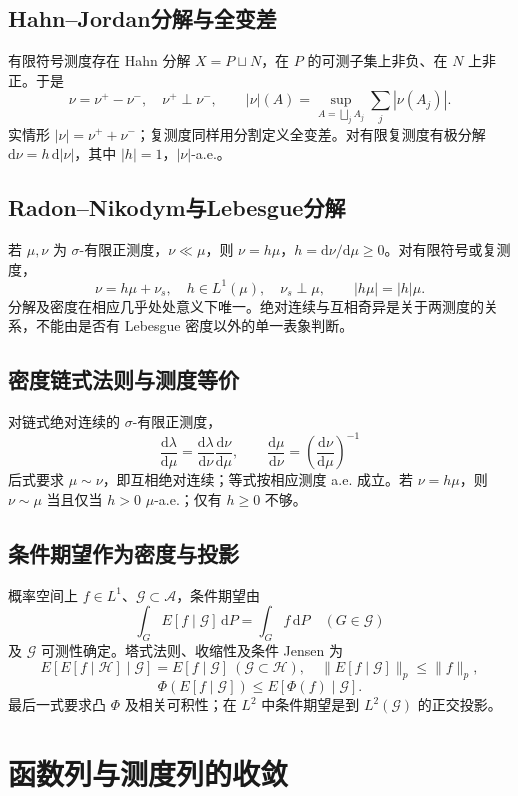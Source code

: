 \documentclass[../main.tex]{subfiles}
\begin{document}
\subsection{Hahn--Jordan分解与全变差}
有限符号测度存在 Hahn 分解 $X=P\sqcup N$，在 $P$ 的可测子集上非负、在 $N$ 上非正。于是
\[
\nu=\nu^+-\nu^-,\quad\nu^+\perp\nu^-,\qquad
|\nu|(A)=\sup_{A=\bigsqcup_jA_j}\sum_j|\nu(A_j)|.
\]
实情形 $|\nu|=\nu^++\nu^-$；复测度同样用分割定义全变差。对有限复测度有极分解 $\mathrm d\nu=h\,\mathrm d|\nu|$，其中 $|h|=1$，$|\nu|$-a.e.。
\subsection{Radon--Nikodym与Lebesgue分解}
若 $\mu,\nu$ 为 $\sigma$-有限正测度，$\nu\ll\mu$，则 $\nu=h\mu$，$h=\mathrm d\nu/\mathrm d\mu\ge0$。对有限符号或复测度，
\[
\nu=h\mu+\nu_s,\quad h\in L^1(\mu),\quad\nu_s\perp\mu,
\qquad |h\mu|=|h|\mu.
\]
分解及密度在相应几乎处处意义下唯一。绝对连续与互相奇异是关于两测度的关系，不能由是否有 Lebesgue 密度以外的单一表象判断。
\subsection{密度链式法则与测度等价}
对链式绝对连续的 $\sigma$-有限正测度，
\[
\frac{\mathrm d\lambda}{\mathrm d\mu}
=\frac{\mathrm d\lambda}{\mathrm d\nu}\frac{\mathrm d\nu}{\mathrm d\mu},\qquad
\frac{\mathrm d\mu}{\mathrm d\nu}=\left(\frac{\mathrm d\nu}{\mathrm d\mu}\right)^{-1}
\]
后式要求 $\mu\sim\nu$，即互相绝对连续；等式按相应测度 a.e. 成立。若 $\nu=h\mu$，则 $\nu\sim\mu$ 当且仅当 $h>0$ $\mu$-a.e.；仅有 $h\ge0$ 不够。
\subsection{条件期望作为密度与投影}
概率空间上 $f\in L^1$、$\mathcal G\subset\mathcal A$，条件期望由
\[
\int_G E[f\mid\mathcal G]\,\mathrm dP=\int_Gf\,\mathrm dP\quad(G\in\mathcal G)
\]
及 $\mathcal G$ 可测性确定。塔式法则、收缩性及条件 Jensen 为
\[
E[E[f\mid\mathcal H]\mid\mathcal G]=E[f\mid\mathcal G]\ (\mathcal G\subset\mathcal H),\quad
\|E[f\mid\mathcal G]\|_p\le\|f\|_p,
\]
\[
\Phi(E[f\mid\mathcal G])\le E[\Phi(f)\mid\mathcal G].
\]
最后一式要求凸 $\Phi$ 及相关可积性；在 $L^2$ 中条件期望是到 $L^2(\mathcal G)$ 的正交投影。
\section{函数列与测度列的收敛}
\end{document}
